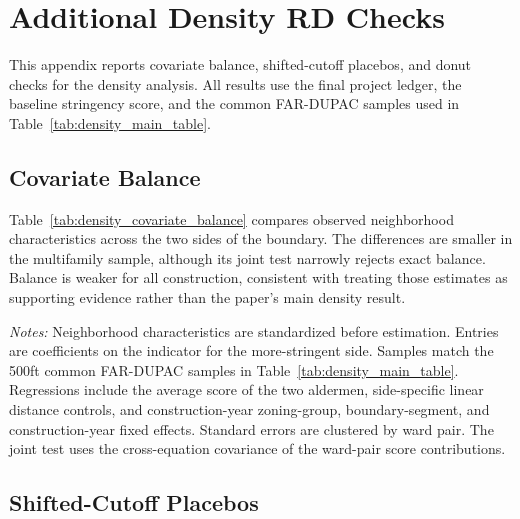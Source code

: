 
\section{Additional Density RD Checks}
\label{sec:appendix_density}

This appendix reports covariate balance, shifted-cutoff placebos, and donut checks for the density analysis.
All results use the final project ledger, the baseline stringency score, and the common FAR-DUPAC samples used in Table~\ref{tab:density_main_table}.

\subsection{Covariate Balance}

Table~\ref{tab:density_covariate_balance} compares observed neighborhood characteristics across the two sides of the boundary.
The differences are smaller in the multifamily sample, although its joint test narrowly rejects exact balance.
Balance is weaker for all construction, consistent with treating those estimates as supporting evidence rather than the paper's main density result.

\begin{table}[H]
    \centering
    \caption{Covariate Balance at Ward Boundaries}
    \label{tab:density_covariate_balance}
    
    \begin{minipage}{0.94\textwidth}
        \vspace{0.35em}
        \footnotesize
        \textit{Notes:} Neighborhood characteristics are standardized before estimation.
        Entries are coefficients on the indicator for the more-stringent side.
        Samples match the 500ft common FAR-DUPAC samples in Table~\ref{tab:density_main_table}.
        Regressions include the average score of the two aldermen, side-specific linear distance controls, and construction-year zoning-group, boundary-segment, and construction-year fixed effects.
        Standard errors are clustered by ward pair.
        The joint test uses the cross-equation covariance of the ward-pair score contributions.
    \end{minipage}
\end{table}

\subsection{Shifted-Cutoff Placebos}

